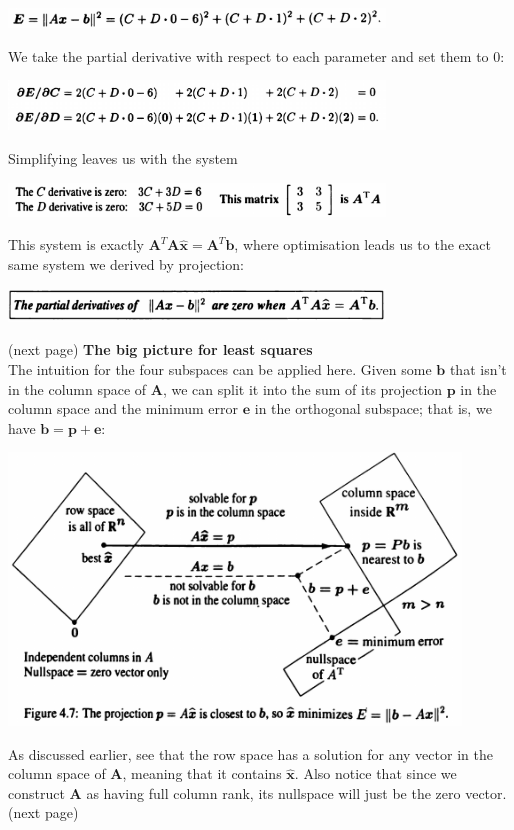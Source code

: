\documentclass{report}
\begin{document}
\begin{center}
\includegraphics[width=10cm]{69}
\end{center}
We take the partial derivative with respect to each parameter and set them to 0:
\begin{center}
\includegraphics[width=10cm]{70}
\end{center}
Simplifying leaves us with the system
\begin{center}
\includegraphics[width=10cm]{71}
\end{center}
This system is exactly $\bm A^T\bm A\hat{\bm x}=\bm A^T\bm b$, where optimisation leads us to the exact same system we derived by projection:
\begin{center}
\includegraphics[width=10cm]{72}
\end{center}
(next page)\newpage
\noindent\textbf{The big picture for least squares}\\
The intuition for the four subspaces can be applied here. Given some $\bm b$ that isn't in the column space of $\bm A$, we can split it into the sum of its projection $\bm p$
in the column space and the minimum error $\bm e$ in the orthogonal subspace; that is, we have $\bm b=\bm p+\bm e$:
\begin{center}
\includegraphics[width=12cm]{73}
\end{center}
As discussed earlier, see that the row space has a solution for any vector in the column space of $\bm A$, meaning that it contains $\hat{\bm x}$. Also notice that since
we construct $\bm A$ as having full column rank, its nullspace will just be the zero vector.\\
(next page)\newpage
\end{document}
